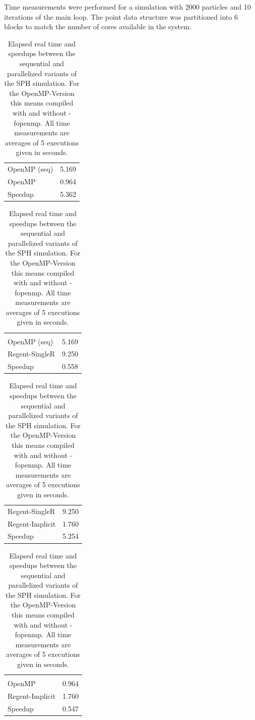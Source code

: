 \documentclass{article}      %
\begin{document}
Time measurements were performed for a simulation with 2000 particles and 10 iterations of the main loop. The point data structure was partitioned into 6 blocks to match the number of cores available in the system. 
\begin{table}[htb]
	\centering
	\begin{minipage}{0.45\textwidth}
		\centering
		\begin{tabular}{ l r }
			OpenMP (seq)  & 5.169 \\
			OpenMP  & 0.964 \\ 
			\hline
			Speedup & 5.362 \\ 
		\end{tabular}

		\begin{tabular}{ l r }
			\vspace{0.3 cm} \\
			OpenMP (seq)  & 5.169 \\
			Regent-SingleR  & 9.250 \\ 
			\hline
			Speedup\footref{fnt:caution} & 0.558 \\ 
		\end{tabular}
	\end{minipage}\hfill
	\begin{minipage}{0.45\textwidth}
		\centering
		\begin{tabular}{ l r }
			Regent-SingleR  & 9.250 \\
			Regent-Implicit  & 1.760 \\ 
			\hline
			Speedup & 5.254 \\ 
		\end{tabular}

		\begin{tabular}{ l r }
			\vspace{0.3 cm} \\
			OpenMP  & 0.964 \\
			Regent-Implicit  & 1.760 \\ 
			\hline
			Speedup\footref{fnt:caution} & 0.547 \\ 
		\end{tabular}

	\end{minipage} 

	\caption{Elapsed real time and speedups between the sequential and parallelized variants of the SPH simulation. For the OpenMP-Version this means compiled with and without -fopenmp. All time measurements are averages of 5 executions given in seconds.}\label{tab:time_measurements}
\end{table}
\end{document}
